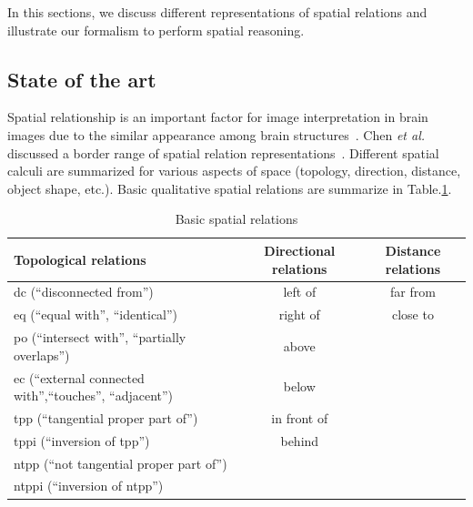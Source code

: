\documentclass{article}
\begin{document}
 In this sections, we discuss different representations of spatial relations and illustrate our formalism to perform spatial reasoning.

\subsection{State of the art}
Spatial relationship is an important factor for image interpretation in brain images due to the similar appearance among brain structures~\cite{Bloch2005fuzzy}.
Chen \textit{et al.} discussed a border range of spatial relation representations~\cite{chen2013survey}. Different spatial calculi are summarized for various aspects of space 
(topology, direction, distance, object shape, etc.). Basic qualitative spatial relations are summarize in Table.\ref{tab:sr}.
\begin{center}
\begin{table}[h]
   \begin{tabular}{| l | c | c |}
    \hline
    Topological relations & Directional relations & Distance relations \\ \hline
    dc (``disconnected from'') & left of & far from \\ 
    eq (``equal with'', ``identical'') & right of & close to \\
    po (``intersect with'', ``partially overlaps'') & above  &   \\
    ec (``external connected with'',``touches'', ``adjacent'') & below &  \\
    tpp (``tangential proper part of'') & in front of &  \\
    tppi (``inversion of tpp'') &  behind  &   \\
    ntpp (``not tangential proper part of'') &   &  \\
    ntppi (``inversion of ntpp'') &  &  \\
    \hline
  \end{tabular}
  \caption{Basic spatial relations}
  \label{tab:sr}  
\end{table}
\end{center}
\end{document}
